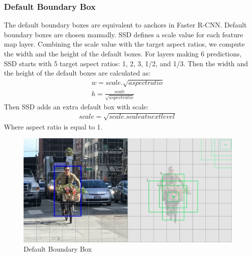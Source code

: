         \subsubsection{Default Boundary Box}
            The default boundary boxes are equivalent to anchors in Faster R-CNN. Default boundary boxes are chosen manually. SSD defines a scale value for each feature map layer. Combining the scale value with the target aspect ratios, we compute the width and the height of the default boxes. For layers making 6 predictions, SSD starts with 5 target aspect ratios: 1, 2, 3, 1/2, and 1/3. Then the width and the height of the default boxes are calculated as:
            \begin{align}
                w = scale.\sqrt{aspect ratio} \\ 
                h = \frac{scale}{\sqrt{aspect ratio}}
            \end{align}
            \vspace{3mm}
            Then SSD adds an extra default box with scale: 
            \begin{align}
                scale = \sqrt{scale.scale at next level}
            \end{align}
            \vspace{3mm}
            Where aspect ratio is equal to 1.
            \begin{figure}[H]
                \centering
                \includegraphics[width=0.6\linewidth]{img/boundary.png}
                \caption{Default Boundary Box}
            \end{figure}
